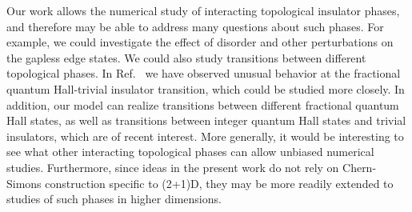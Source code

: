 Our work allows the numerical study of interacting topological insulator phases, and therefore may be able to address many questions about such phases. For example, we could investigate the effect of disorder and other perturbations on the gapless edge states. We could also study transitions between different topological phases. In Ref.~\cite{short_range3} we have observed unusual behavior at the fractional quantum Hall-trivial insulator transition, which could be studied more closely. In addition, our model can realize transitions between different fractional quantum Hall states, as well as transitions between integer quantum Hall states and trivial insulators, which are of recent interest.\cite{GroverVishwanath2012, LuLee2012_QPT}
More generally, it would be interesting to see what other interacting topological phases can allow unbiased numerical studies. Furthermore, since ideas in the present work do not rely on Chern-Simons construction specific to (2+1)D, they may be more readily extended to studies of such phases in higher dimensions.\cite{VishwanathSenthil2012, KeyserlingkBurnellSimon2013, XuSenthil2013, Wen2013}




